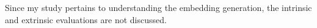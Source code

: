 \begin{sloppypar*}

    \begin{mybox}
        Since my study pertains to understanding the embedding generation, the
        intrinsic and extrinsic evaluations are not discussed.
    \end{mybox}
\end{sloppypar*}